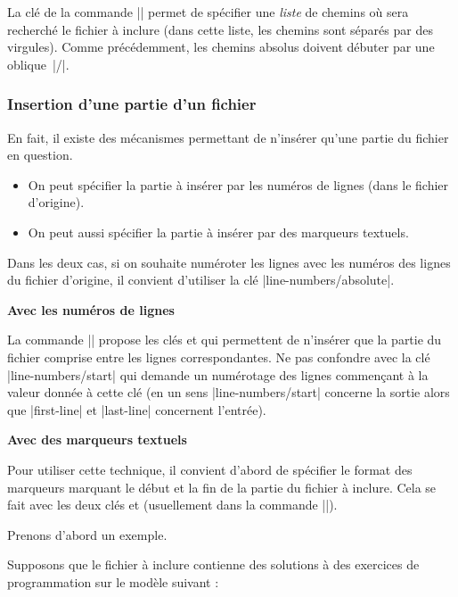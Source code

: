 \documentclass[dvipsnames,svgnames]{article}
\begin{document}
La clé  de la commande |\PitonOptions| permet de spécifier une
\emph{liste} de chemins où sera recherché le fichier à inclure (dans cette liste, les
chemins sont séparés par des virgules). Comme précédemment, les chemins absolus doivent
débuter par une oblique~|/|.


\subsubsection{Insertion d'une partie d'un fichier}

\label{part-of-a-file}

En fait, il existe des mécanismes permettant de n'insérer qu'une partie du fichier en
question.
\begin{itemize}
\item On peut spécifier la partie à insérer par les numéros de lignes (dans le fichier
d'origine).
\item On peut aussi spécifier la partie à insérer par des marqueurs textuels.
\end{itemize}
Dans les deux cas, si on souhaite numéroter les lignes avec les numéros des lignes du
fichier d'origine, il convient d'utiliser la clé |line-numbers/absolute|.

\bigskip
\textbf{Avec les numéros de lignes}

\nobreak
La commande |\PitonInputFile| propose les clés  et
 qui permettent de n'insérer que la partie du fichier comprise entre
les lignes correspondantes. Ne pas confondre avec la clé |line-numbers/start| qui demande
un numérotage des lignes commençant à la valeur donnée à cette clé (en un sens
|line-numbers/start| concerne la sortie alors que |first-line| et |last-line| concernent
l'entrée).

\bigskip
\textbf{Avec des marqueurs textuels}


\nobreak
Pour utiliser cette technique, il convient d'abord de spécifier le format des marqueurs
marquant le début et la fin de la partie du fichier à inclure. Cela se fait avec les deux
clés  et  (usuellement dans la
commande |\PitonOptions|).

\medskip
Prenons d'abord un exemple.

\medskip
Supposons que le fichier à inclure contienne des solutions à des exercices de
programmation sur le modèle suivant :
\end{document}
